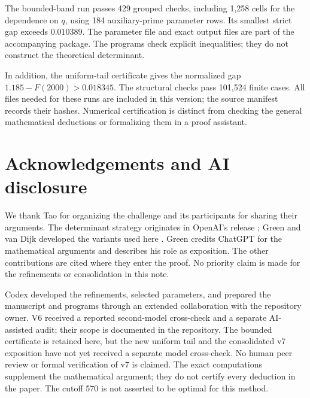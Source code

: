 \documentclass[11pt]{article}
\begin{document}
The bounded-band run passes 429 grouped checks, including 1,258 cells
for the dependence on \(q\), using 184 auxiliary-prime parameter
rows. Its smallest strict gap exceeds \(0.010389\).
The parameter file and exact output files are part of the accompanying
package. The programs check explicit inequalities; they do not
construct the theoretical determinant.


In addition, the uniform-tail certificate gives the normalized gap
\(1.185-F(2000)>0.018345\). The structural checks pass 101,524 finite
cases. All files needed for these runs are included in this version;
the source manifest records their hashes. Numerical certification is
distinct from checking the general mathematical deductions or formalizing
them in a proof assistant.

\section*{Acknowledgements and AI disclosure}
We thank Tao for organizing the challenge and its participants for
sharing their arguments. The determinant strategy originates in OpenAI's
release \cite{openai}; Green and van Dijk developed the variants used
here \cite{green,vandijk}. Green credits ChatGPT for the mathematical
arguments and describes his role as exposition. The other contributions
are cited where they enter the proof. No priority claim is made for the
refinements or consolidation in this note.

Codex developed the refinements, selected parameters, and prepared the
manuscript and programs through an extended collaboration with the
repository owner. V6 received a reported second-model cross-check and a
separate AI-assisted audit; their scope is documented in the repository.
The bounded certificate is retained here, but the new uniform tail and
the consolidated v7 exposition have not yet received a separate model
cross-check. No human peer review or formal verification of v7 is claimed.
The exact computations supplement the mathematical argument; they do
not certify every deduction in the paper. The cutoff 570 is not asserted
to be optimal for this method.

\appendix
\end{document}
